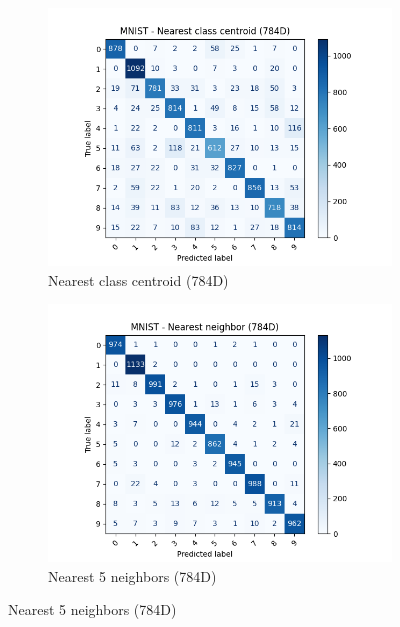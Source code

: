 \begin{figure}[htbp]
        \begin{subfigure}[b]{.33\linewidth}
            \centering
            \includegraphics[width=1\linewidth]{../source/mnist/pictures/nearestClassCentroid-confusion-784d.png}
            \caption{Nearest class centroid (784D)}
            \label{fig:mnist-confusion-ncc-784}
        \end{subfigure}%
        \begin{subfigure}[b]{0.33\linewidth}
            \centering
            \includegraphics[width=1\linewidth]{../source/mnist/pictures/nearestNeighbor-5-confusion-784d.png}
            \caption{Nearest 5 neighbors (784D)}
            \label{fig:mnist-confusion-nn-784}

\end{subfigure}
\end{figure}
